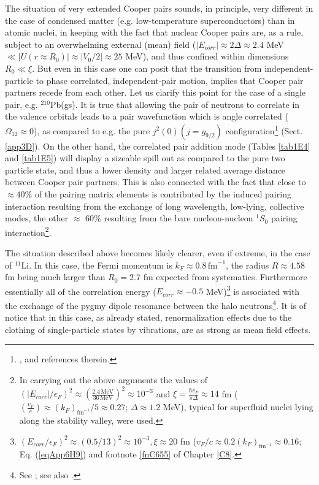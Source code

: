 The situation of very extended Cooper pairs sounds, in principle, very different in the case of condensed matter (e.g. low-temperature superconductors) than in atomic nuclei, in keeping with the fact that nuclear Cooper pairs are, as a rule, subject to an overwhelming external (mean) field ($|E_{corr}|\approx 2\Delta\approx2.4$ MeV $\ll |U(r\approx R_0)|\approx |V_0/2|\approx 25 $ MeV), and thus confined within dimensions $R_0\ll\xi$. But even in this case one can posit that  the transition from independent-particle to phase correlated, independent-pair motion, implies that Cooper pair partners recede from each other. Let us clarify this point for the case of a single pair, e.g. $^{210}$Pb(gs). It is true that allowing the pair of neutrons to correlate in the valence orbitals leads to a pair wavefunction which is angle correlated ($\Omega_{12}\approx 0$), as compared to e.g. the pure $j^2(0)(j=g_{9/2})$ configuration\footnote{\label{C4f17}\cite{Bertsch:67}, \cite{Ferreira:84,Matsuo:13} and references therein.} (Sect. \ref{app3D}). On the other hand, the correlated pair addition mode (Tables \ref{tab1E4} and \ref{tab1E5}) will display a sizeable spill out as compared to the pure two particle state, and thus a lower density and larger related average distance between Cooper pair partners. This is also connected with the fact that close to $\approx 40$\% of the pairing matrix elements is contributed by the induced pairing interaction resulting from the exchange of long wavelength, low-lying, collective modes, the other $\approx$ 60\% resulting from the bare nucleon-nucleon $^1S_0$ pairing interaction\footnote{\label{f17C4} In carrying out the above arguments the values of $(|E_{corr}|/\epsilon_F)^2\approx \left(\frac{2.4 \,\text{MeV}}{36\,\text{MeV}}\right)^2\approx 10^{-3}$ and $\xi=\frac{\hbar v_F}{\pi\Delta}\approx 14$ fm ($(\frac{v_F}{c})\approx (k_F)_{\text{fm}^{-1}}/5\approx 0.27$; $\Delta\approx 1.2$ MeV), typical for superfluid nuclei lying along the stability valley, were used.}. 


The situation described above becomes likely clearer, even if extreme, in the case of $^{11}$Li. In this case, the Fermi momentum is $k_F\approx 0.8\, \text{fm}^{-1}$, the radius $R\approx 4.58 $fm being much larger than $R_0=2.7$ fm expected from systematics. Furthermore essentially all of the correlation energy ($E_{corr}\approx -0.5$ MeV)\footnote{\label{f18C4} $(E_{corr}/\epsilon_F)^2\approx (0.5/13)^2\approx 10^{-3}, \xi\approx 20 $ fm ($v_F/c\approx0.2(k_F)_{\text{fm}^{-1}}\approx 0.16$; Eq. (\ref{eqApp6H9}) and footnote \ref{fnC655} of Chapter \ref{C8}.}  is associated with the exchange of the  pygmy dipole resonance between the halo neutrons\footnote{See \cite{Barranco:01}; see also \cite{Broglia:19}.}. It is of notice that in this case, as already stated, renormalization effects due to the clothing of single-particle states by vibrations, are as strong as mean field effects.



